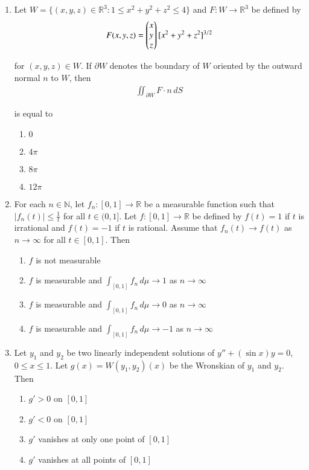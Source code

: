 \documentclass[journal]{IEEEtran}
\numberwithin{equation}{enumi}
\numberwithin{figure}{enumi}
\begin{document}
\begin{enumerate}
\item
Let $W = \{ (x, y, z) \in \mathbb{R}^3 : 1 \leq x^2 + y^2 + z^2 \leq 4 \}$ and $F: W \rightarrow \mathbb{R}^3$ be defined by
\begin{align}
    F(x, y, z) = \begin{pmatrix}x \\ y \\ z\end{pmatrix} [x^2 + y^2 + z^2]^{3/2}
\end{align}

for $(x, y, z) \in W$. If $\partial W$ denotes the boundary of $W$ oriented by the outward normal $n$ to $W$, then 
\begin{align}
    \iint_{\partial W} F \cdot n \, dS
\end{align}

is equal to
\hfill{}
\begin{multicols}{4}
\begin{enumerate}
    \item $0$
    \item $4\pi$
    \item $8\pi$
    \item $12\pi$
\end{enumerate}
\end{multicols}


\item
For each $n \in \mathbb{N}$, let $f_n : [0,1] \to \mathbb{R}$ be a measurable function such that $|f_n(t)| \leq \frac{1}{t}$ for all $t \in (0,1]$. Let $f : [0,1] \to \mathbb{R}$ be defined by $f(t) = 1$ if $t$ is irrational and $f(t) = -1$ if $t$ is rational. Assume that $f_n(t) \to f(t)$ as $n \to \infty$ for all $t \in [0,1]$. Then
\hfill{}

\begin{enumerate}
    \item $f$ is not measurable
    \item $f$ is measurable and $\int_{[0,1]} f_n \, d\mu \to 1$ as $n\to\infty$
    \item $f$ is measurable and $\int_{[0,1]} f_n \, d\mu \to 0$ as $n\to\infty$
    \item $f$ is measurable and $\int_{[0,1]} f_n \, d\mu \to -1$ as $n\to\infty$
\end{enumerate}

\item
Let $y_1$ and $y_2$ be two linearly independent solutions of $y'' + (\sin x)y = 0$, $0 \leq x \leq 1$. Let $g(x) = W(y_1, y_2)(x)$ be the Wronskian of $y_1$ and $y_2$. Then
\hfill{}
\begin{multicols}{2}
\begin{enumerate}
    \item $g' > 0$ on $[0,1]$
    \item $g' < 0$ on $[0,1]$
    \item $g'$ vanishes at only one point of $[0,1]$
    \item $g'$ vanishes at all points of $[0,1]$
\end{enumerate}
\end{multicols}



\end{enumerate}
\end{document}
